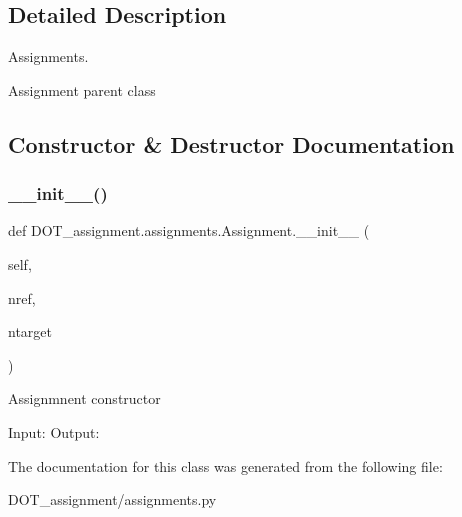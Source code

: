 \subsection{Detailed Description}
Assignments. 

\begin{DoxyVerb}Assignment parent class
\end{DoxyVerb}
 

\subsection{Constructor \& Destructor Documentation}
\mbox{\label{class_d_o_t__assignment_1_1assignments_1_1_assignment_a68df0627565c0ac579588ecfdb4783f5}} 
\subsubsection{\texorpdfstring{\_\_init\_\_()}{\_\_init\_\_()}}
{\footnotesize\ttfamily def D\+O\+T\+\_\+assignment.\+assignments.\+Assignment.\+\_\+\+\_\+init\+\_\+\+\_\+ (\begin{DoxyParamCaption}\item[{}]{self,  }\item[{}]{nref,  }\item[{}]{ntarget }\end{DoxyParamCaption})}

\begin{DoxyVerb}Assignmnent constructor

Input:
Output:\end{DoxyVerb}
 

The documentation for this class was generated from the following file\+:\begin{DoxyCompactItemize}
\item 
D\+O\+T\+\_\+assignment/assignments.\+py\end{DoxyCompactItemize}
